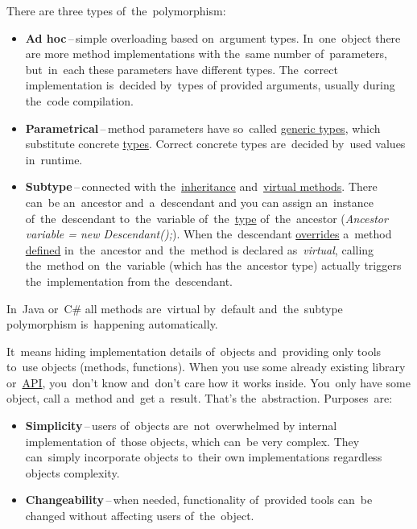\noindent There are three types of~the~polymorphism:
\begin{itemize}
    \item \textbf{Ad hoc}\,--\,simple overloading based on~argument types. In~one~object there are more method implementations with the~same number of~parameters, but~in~each these parameters have different types. The~correct implementation is~decided by~types of provided arguments, usually during the~code compilation.
    \item \textbf{Parametrical}\,--\,method parameters have so~called \hyperref[javagenerics]{generic types}, which substitute concrete \hyperref[datatypes]{types}. Correct concrete types are~decided by~used values in~runtime.
    \item \textbf{Subtype}\,--\,connected with the~\hyperref[inheritance]{inheritance} and~\hyperref[javavirtualmethods]{virtual methods}. There can~be an~ancestor and~a~descendant and you can assign an~instance of~the~descendant to~the~variable of~the~\hyperref[datatype]{type} of~the~ancestor (\textit{Ancestor variable = new Descendant();}). When the~descendant \hyperref[javaoverride]{overrides} a~method \hyperref[declarationdefinition]{defined} in~the~ancestor and~the~method is declared as~\textit{virtual}, calling the~method on~the~variable (which has the~ancestor type) actually triggers the~implementation from the~descendant.
\end{itemize}

\warning In~Java or~C\# all methods are~virtual by~default and~the~subtype polymorphism is~happening automatically.

\label{abstraction}
It~means hiding implementation details of~objects and~providing only tools to~use objects (methods, functions). When you use some already existing library or~\hyperref[api]{API}, you~don't know and~don't care how it works inside. You~only have some object, call a~method and~get a~result. That's the~abstraction. Purposes~are:
\begin{itemize}
    \item \textbf{Simplicity}\,--\,users of~objects are~not~overwhelmed by internal implementation of~those objects, which can~be very complex. They can~simply incorporate objects to~their own implementations regardless objects complexity.
    \item \textbf{Changeability}\,--\,when needed, functionality of~provided tools can~be changed without affecting users of~the~object.
\end{itemize}

